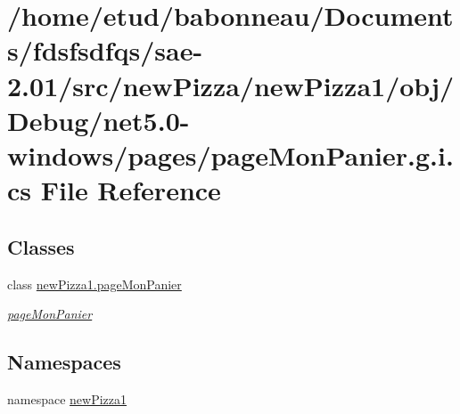 \hypertarget{net5_80-windows_2pages_2pageMonPanier_8g_8i_8cs}{}\section{/home/etud/babonneau/\+Documents/fdsfsdfqs/sae-\/2.01/src/new\+Pizza/new\+Pizza1/obj/\+Debug/net5.0-\/windows/pages/page\+Mon\+Panier.g.\+i.\+cs File Reference}
\label{net5_80-windows_2pages_2pageMonPanier_8g_8i_8cs}
\subsection*{Classes}
\begin{DoxyCompactItemize}
\item 
class \hyperlink{classnewPizza1_1_1pageMonPanier}{new\+Pizza1.\+page\+Mon\+Panier}
\begin{DoxyCompactList}\small\item\em \hyperlink{classnewPizza1_1_1pageMonPanier}{page\+Mon\+Panier} \end{DoxyCompactList}\end{DoxyCompactItemize}
\subsection*{Namespaces}
\begin{DoxyCompactItemize}
\item 
namespace \hyperlink{namespacenewPizza1}{new\+Pizza1}
\end{DoxyCompactItemize}
